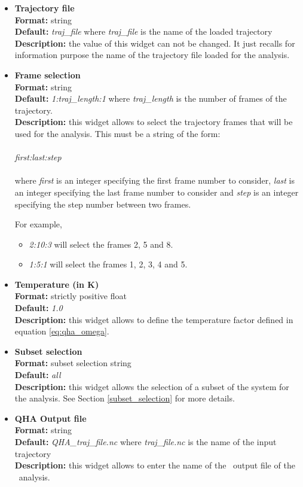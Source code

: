 \documentclass[a4paper,11pt]{report}
\begin{document}
\begin{itemize}
\item \textbf{Trajectory file}\\
\textbf{Format:} string\\
\textbf{Default:} \textit{traj\_file} where \textit{traj\_file} is the name of the loaded trajectory\\
\textbf{Description:} the value of this widget can not be changed. It just recalls for information purpose the name
of the trajectory file loaded for the analysis.

\item \textbf{Frame selection}\\
\textbf{Format:} string\\
\textbf{Default:} \textit{1:traj\_length:1} where \textit{traj\_length} is the number of frames of the trajectory.\\
\textbf{Description:} this widget allows to select the trajectory frames that will be used for the analysis. This must
be a string of the form:
\\\\
\textit{first:last:step}
\\\\
where \textit{first} is an integer specifying the first frame number to consider, \textit{last} is an integer specifying the last 
frame number to consider and \textit{step} is an integer specifying the step number between two frames.

For example,
\begin{itemize}
\item \textit{2:10:3} will select the frames 2, 5 and 8.
\item \textit{1:5:1} will select the frames 1, 2, 3, 4 and 5.
\end{itemize}

\item \textbf{Temperature (in K)}\\
\textbf{Format:} strictly positive float\\
\textbf{Default:} \textit{1.0}\\
\textbf{Description:} this widget allows to define the temperature factor defined in equation \ref{eq:qha_omega}.

\item \textbf{Subset selection}\\
\textbf{Format:} subset selection string\\
\textbf{Default:} \textit{all}\\
\textbf{Description:} this widget allows the selection of a subset of the system for the analysis. 
See Section \ref{subset_selection} for more details.

\item \textbf{QHA Output file}\\
\textbf{Format:} string\\
\textbf{Default:} \textit{QHA\_traj\_file.nc} where \textit{traj\_file.nc} is the name of the input trajectory\\
\textbf{Description:} this widget allows to enter the name of the \NetCDF\ output file of the \QHA\ analysis.
\end{itemize}
\end{document}
